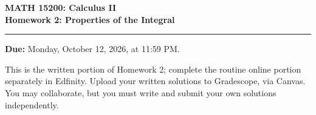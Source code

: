 \documentclass[12pt,letterpaper]{article}
\begin{document}
\begin{center}
  {\large\bfseries MATH 15200: Calculus II}\\
  {\large\bfseries Homework 2: Properties of the Integral}
\end{center}

\vspace{0.25em}
\hrule
\vspace{0.8em}

\textbf{Due:} Monday, October 12, 2026, at 11:59 PM.

This is the written portion of Homework 2; complete the routine online portion
separately in Edfinity. Upload your written solutions to Gradescope, via Canvas. You may
collaborate, but you must write and submit your own solutions independently.

\vspace{0.3em}

\noindent{}

\vspace{0.8em}
\end{document}
